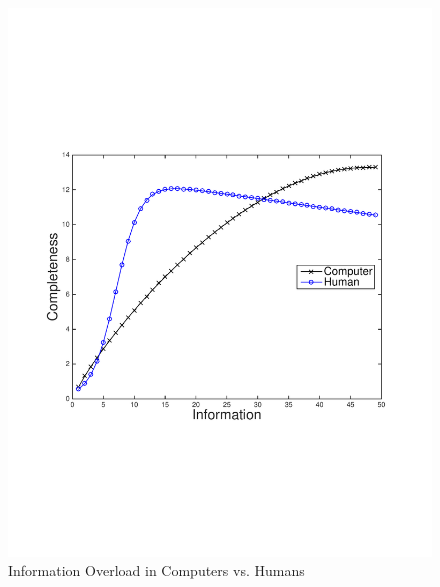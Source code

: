 \begin{figure}
\begin{centering}
    \includegraphics[clip=true, trim = 15mm 65mm 25mm 70mm, scale=0.40]{figures/example_qoi_trends/completeness_vs_info_hvc.pdf}
    \caption{Information Overload in Computers vs. Humans }
    \label{fig:comp_vs_info_hvc}
\end{centering}
\end{figure}

